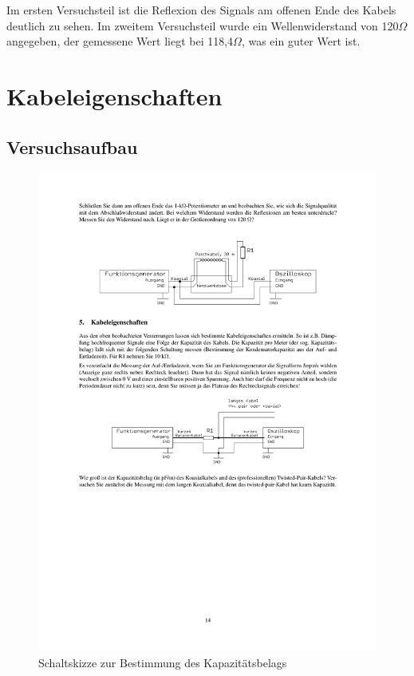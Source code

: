 \documentclass[12pt,a4paper]{article}
\begin{document}
Im ersten Versuchsteil ist die Reflexion des Signals am offenen Ende des Kabels deutlich zu sehen. Im zweitem Versuchsteil wurde ein Wellenwiderstand von 120$\Omega$ angegeben, der gemessene Wert liegt bei 118,4$\Omega$, was ein guter Wert ist.


\section{Kabeleigenschaften}
\subsection{Versuchsaufbau}

\begin{figure}[H] 
  \centering
    \includegraphics[trim = 10mm 110mm 10mm 140mm, clip, scale = 1]{4-5.pdf}
  	\caption[Schaltskizze zur Bestimmung des Kapazitätsbelags]{Schaltskizze zur Bestimmung des Kapazitätsbelags\footnotemark}
  \label{fig:5}
\end{figure}
\end{document}
